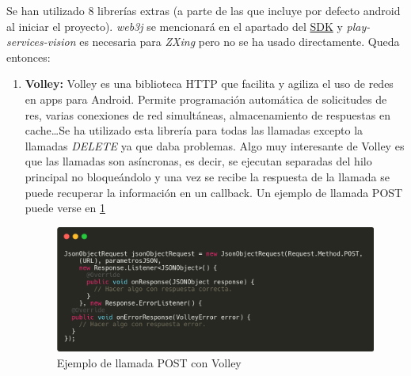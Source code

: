 Se han utilizado 8 librerías extras (a parte de las que incluye por defecto android al iniciar el proyecto). \emph{web3j} se mencionará en el apartado del \hyperref[sec:SDK]{SDK} y \emph{play-services-vision} es necesaria para \emph{ZXing} pero no se ha usado directamente. Queda entonces: \\
\begin{enumerate}
\item \textbf{Volley: } Volley es una biblioteca HTTP que facilita y agiliza el uso de redes en apps para Android. Permite programación automática de solicitudes de res, varias conexiones de red simultáneas, almacenamiento de respuestas en cache\dots Se ha utilizado esta librería para todas las llamadas excepto la llamadas \emph{DELETE} ya que daba problemas. Algo muy interesante de Volley es que las llamadas son asíncronas, es decir, se ejecutan separadas del hilo principal no bloqueándolo y una vez se recibe la respuesta de la llamada se puede recuperar la información en un callback. Un ejemplo de llamada POST puede verse en \ref{fig:post_volley} \\


\begin{figure}[h!]
  \centering
  \includegraphics[width=0.8\linewidth]{figs/Desarrollo/Codigo/POST_Volley}
  \caption[Llamada POST con Volley]{Ejemplo de llamada POST con Volley}
  \label{fig:post_volley}
\end{figure}


\end{enumerate}

